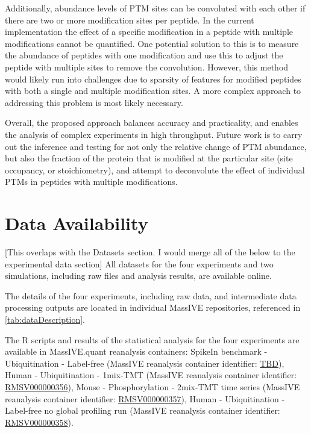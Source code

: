 \documentclass[mcp]{article}
\numberwithin{table}{section}
\def\todo#1{{\color{red}[#1]}}
\begin{document}
Additionally, abundance levels of PTM sites can be convoluted with each other if there are two or more modification sites per peptide. In the current implementation the effect of a specific modification in a peptide with multiple modifications cannot be quantified. One potential solution to this is to measure the abundance of peptides with one modification and use this to adjust the peptide with multiple sites to remove the convolution. However, this method would likely run into challenges due to sparsity of features for modified peptides with both a single and multiple modification sites. A more complex approach to addressing this problem is most likely necessary.

Overall, the proposed approach balances accuracy and practicality, and enables the analysis of complex experiments in high throughput. Future work is to carry out the inference and testing for not only the relative change of PTM abundance, but also the fraction of the protein that is modified at the particular site (site occupancy, or stoichiometry), and attempt to deconvolute the effect of individual PTMs in peptides with multiple modifications.

\section{Data Availability}

\todo{This overlaps with the Datasets section. I would merge all of the below to the experimental data section} All datasets for the four experiments and two simulations, including raw files and analysis results, are available online.

The details of the four experiments, including raw data, and intermediate data processing outputs are located in individual MassIVE repositories, referenced in \ref{tab:dataDescription}.

The R scripts and results of the statistical analysis for the four experiments are available in MassIVE.quant reanalysis containers: SpikeIn benchmark - Ubiquitination - Label-free (MassIVE reanalysis container identifier: \href{https://massive.ucsd.edu/ProteoSAFe/private-dataset.jsp?task=c4c583ecf7f941cdac87f7a4f872517b}{TBD}), Human - Ubiquitination - 1mix-TMT (MassIVE reanalysis container identifier: \href{https://massive.ucsd.edu/ProteoSAFe/reanalysis_container.jsp?task=b639fa5d0ff24ce78abdca13f4b18c0a}{RMSV000000356}), Mouse - Phosphorylation - 2mix-TMT time series (MassIVE reanalysis container identifier: \href{https://massive.ucsd.edu/ProteoSAFe/reanalysis_container.jsp?task=79406d32c1f9413daf7756e6eeb24968}{RMSV000000357}), Human - Ubiquitination - Label-free no global profiling run (MassIVE reanalysis container identifier: \href{https://massive.ucsd.edu/ProteoSAFe/reanalysis_container.jsp?task=f9e6117e00794ce5b2e8802601be16bc}{RMSV000000358}).
\end{document}
